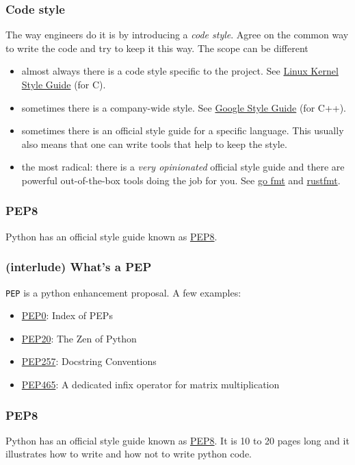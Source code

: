 \documentclass[compress,english,aspectratio=1610]{beamer}
\let\olditem\item
\renewcommand{\item}{\setlength{\itemsep}{\fill}\olditem}
\begin{document}
\begin{frame}
  \frametitle{Code style}
  The way engineers do it is by introducing a \textit{code style}. Agree on the common way to write the code and try to keep it this way. The scope can be different
  \begin{itemize}
  \item almost always there is a code style specific to the project. See \href{https://www.kernel.org/doc/html/v4.10/process/coding-style.html}{Linux Kernel Style Guide} (for C).
  \item sometimes there is a company-wide style. See \href{https://google.github.io/styleguide/cppguide.html}{Google Style Guide} (for C++).
  \item sometimes there is an official style guide for a specific language. This usually also means that one can write tools that help to keep the style.
  \item the most radical: there is a \textit{very opinionated} official style guide and there are powerful out-of-the-box tools doing the job for you. See \href{https://go.dev/blog/gofmt}{go fmt} and \href{https://github.com/rust-lang/rustfmt}{rustfmt}.
  \end{itemize}
\end{frame}

\begin{frame}
  \frametitle{PEP8}
  Python has an official style guide known as \href{https://www.python.org/dev/peps/pep-0008}{PEP8}.
\end{frame}

\begin{frame}
  \frametitle{(interlude) What's a PEP}
  \texttt{PEP} is a python enhancement proposal. A few examples:
  \begin{itemize}
  	\item \href{https://www.python.org/dev/peps}{PEP0}: Index of PEPs
  	\item \href{https://www.python.org/dev/peps/pep-0020}{PEP20}: The Zen of Python
  	\item \href{https://www.python.org/dev/peps/pep-0257}{PEP257}: Docstring Conventions
    \item \href{https://www.python.org/dev/peps/pep-0465}{PEP465}: A dedicated infix operator for matrix multiplication
  \end{itemize}
\end{frame}

\begin{frame}
  \frametitle{PEP8}
  Python has an official style guide known as \href{https://www.python.org/dev/peps/pep-0008}{PEP8}. It is 10 to 20 pages long and it illustrates how to write and how not to write python code.
\end{frame}
\end{document}
